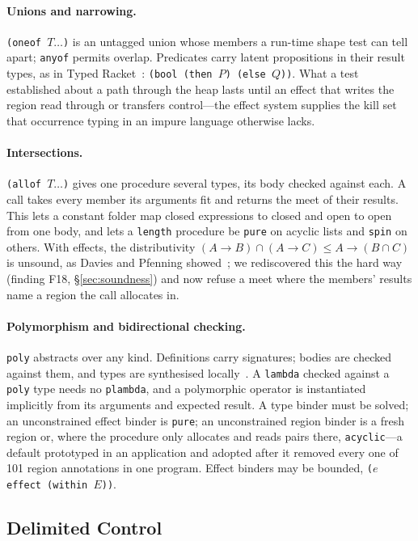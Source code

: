 \documentclass[acmsmall,screen,review]{acmart}
\newcommand{\cd}[1]{\texttt{#1}}
\begin{document}
\paragraph{Unions and narrowing.} \cd{(oneof $T \ldots$)} is an
untagged union whose members a run-time shape test can tell apart;
\cd{anyof} permits overlap. Predicates carry latent propositions in
their result types, as in Typed Racket~\cite{typed-scheme}:
\cd{(bool (then $P$) (else $Q$))}. What a test established about a
path through the heap lasts until an effect that writes the region read
through or transfers control---the effect system supplies the kill set
that occurrence typing in an impure language otherwise lacks.

\paragraph{Intersections.} \cd{(allof $T \ldots$)} gives one procedure
several types, its body checked against each. A call takes every member
its arguments fit and returns the meet of their results. This lets a
constant folder map closed expressions to closed and open to open from
one body, and lets a \cd{length} procedure be \cd{pure} on acyclic
lists and \cd{spin} on others. With effects, the distributivity
$(A{\to}B)\cap(A{\to}C) \le A{\to}(B\cap C)$ is unsound, as Davies and
Pfenning showed~\cite{davies-pfenning}; we rediscovered this the hard
way (finding F18, \S\ref{sec:soundness}) and now refuse a meet where
the members' results name a region the call allocates in.

\paragraph{Polymorphism and bidirectional checking.} \cd{poly} abstracts
over any kind. Definitions carry signatures; bodies are checked against
them, and types are synthesised locally~\cite{local-type-inference,bidir-survey}.
A \cd{lambda} checked against a \cd{poly} type needs no \cd{plambda},
and a polymorphic operator is instantiated implicitly from its arguments
and expected result. A type binder must be solved; an unconstrained
effect binder is \cd{pure}; an unconstrained region binder is a fresh
region or, where the procedure only allocates and reads pairs there,
\cd{acyclic}---a default prototyped in an application and adopted after
it removed every one of 101 region annotations in one program. Effect
binders may be bounded, \cd{($e$ effect (within $E$))}.

\subsection{Delimited Control}
\end{document}
